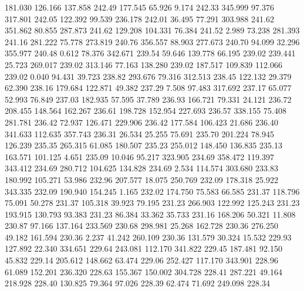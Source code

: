  181.030  126.166  137.858       242.49
 177.545   65.926    9.174       242.33
 345.999   97.376  317.801       242.05
 122.392   99.539  236.178       242.01
  36.495   77.291  303.988       241.62
 351.862   80.855  287.873       241.62
 129.208  104.331   76.384       241.52
   2.989   73.238  281.393       241.16
 281.222   75.778  273.819       240.76
 356.557   88.903  277.673       240.70
  94.099   32.296  355.977       240.48
   0.612   78.376  342.671       239.54
  59.646  139.778   66.195       239.02
 239.441   25.723  269.017       239.02
 313.146   77.163  138.280       239.02
 187.517  109.839  112.066       239.02
   0.040   94.431   39.723       238.82
 293.676   79.316  312.513       238.45
 122.132   29.379   62.390       238.16
 179.684  122.871   49.382       237.29
   7.508   97.483  317.692       237.17
  65.077   52.993   76.849       237.03
 182.935   57.595   37.789       236.93
 166.721   79.331   24.121       236.72
 208.455  148.564  162.267       236.61
 198.728  152.954  227.693       236.57
 338.155   75.408  281.781       236.42
  72.937  126.471  229.906       236.42
 177.584  106.423   21.686       236.40
 341.633  112.635  357.743       236.31
  26.534   25.255   75.691       235.70
 201.224   78.945  126.239       235.35
 265.315   61.085  180.507       235.23
 255.012  148.450  136.835       235.13
 163.571  101.125    4.651       235.09
  10.046   95.217  323.905       234.69
 358.472  119.397  343.412       234.69
 280.712  104.625  134.828       234.69
   2.534  114.574  303.680       233.83
 180.992  105.271   53.986       232.96
 207.577   18.075  250.769       232.09
 178.318   25.922  343.335       232.09
 190.940  154.245    1.165       232.02
 174.750   75.583   66.585       231.37
 118.796   75.091   50.278       231.37
 105.318   39.923   79.195       231.23
 266.903  122.992  125.243       231.23
 193.915  130.793   93.383       231.23
  86.384   33.362   35.733       231.16
 168.206   50.321   11.808       230.87
  97.166  137.164  233.569       230.68
 298.981   25.268  162.728       230.36
 276.250   49.182  161.594       230.36
   2.237   41.242  260.109       230.36
 131.579   30.324   15.532       229.93
 127.892   22.340  334.651       229.64
 243.081  112.170  341.822       229.45
 187.481   92.150   45.832       229.14
 205.612  148.662   63.474       229.06
 252.427  117.170  343.901       228.96
  61.089  152.201  236.320       228.63
 155.367  150.002  304.728       228.41
 287.221   49.164  218.928       228.40
 130.825   79.364   97.026       228.39
  62.474   71.692  249.098       228.34
